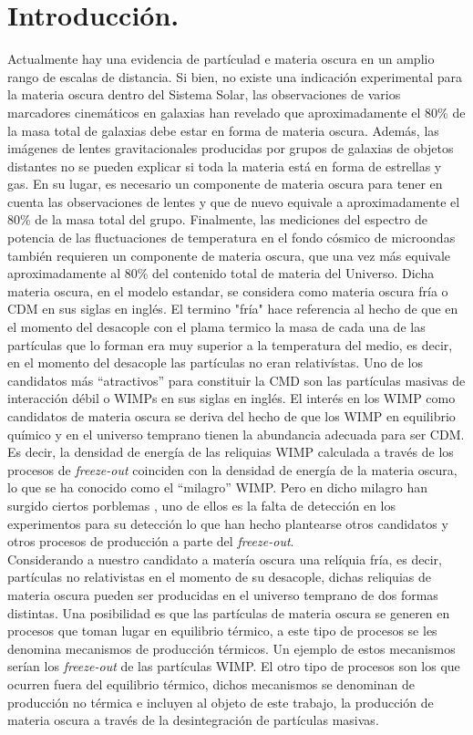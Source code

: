 \documentclass[11pt]{article}
\begin{document}
\section{Introducción.}
Actualmente hay una evidencia de partículad e materia oscura en un amplio rango de escalas de distancia. Si bien, no existe una indicación experimental para la materia oscura dentro del Sistema Solar, las observaciones de varios marcadores cinemáticos en galaxias han revelado que aproximadamente el 80\% de la masa total de galaxias debe estar en forma de materia oscura. Además, las imágenes de lentes gravitacionales producidas por grupos de galaxias de objetos distantes no se pueden explicar si toda la materia está en forma de estrellas y gas. En su lugar, es necesario un componente de materia oscura para tener en cuenta las observaciones de lentes y que de nuevo equivale a aproximadamente el 80\% de la masa total del grupo. Finalmente, las mediciones del espectro de potencia de las fluctuaciones de temperatura en el fondo cósmico de microondas también requieren un componente de materia oscura, que una vez más equivale aproximadamente al 80\% del contenido total de materia del Universo. Dicha materia oscura, en el modelo estandar, se considera como materia oscura fría o CDM en sus siglas en inglés. El termino "fría" hace referencia al hecho de que en el momento del desacople con el plama termico la masa de cada una de las partículas que lo forman era muy superior a la temperatura del medio, es decir, en el momento del desacople las partículas no eran relativístas. Uno de los candidatos más ``atractivos'' para constituir la CMD son las partículas masivas de interacción débil o WIMPs en sus siglas en inglés. El interés en los WIMP como candidatos de materia oscura se deriva del hecho de que los WIMP en equilibrio químico y en el universo temprano tienen la abundancia adecuada para ser CDM. Es decir, la densidad de energía de las reliquias WIMP calculada a través de los procesos de \textit{freeze-out} coinciden con la densidad de energía de la materia oscura, lo que se ha conocido como el ``milagro'' WIMP. Pero en dicho milagro han surgido ciertos porblemas \citep{baer2015dark}, uno de ellos es la falta de detección en los experimentos para su detección lo que han hecho plantearse otros candidatos y otros procesos de producción a parte del \textit{freeze-out}.  \\

Considerando a nuestro candidato a matería oscura una relíquia fría, es decir, partículas no relativistas en el momento de su desacople, dichas reliquias de materia oscura pueden ser producidas en el universo temprano de dos formas distintas. Una posibilidad es que las partículas de materia oscura se generen en procesos que toman lugar en equilibrio térmico, a este tipo de procesos se les denomina mecanismos de producción térmicos. Un ejemplo de estos mecanismos serían los \textit{freeze-out} de las partículas WIMP. El otro tipo de procesos son los que ocurren fuera del equilibrio térmico, dichos mecanismos se denominan de producción no térmica e incluyen al objeto de este trabajo, la producción de materia oscura a través de la desintegración de partículas masivas.\\
\end{document}
